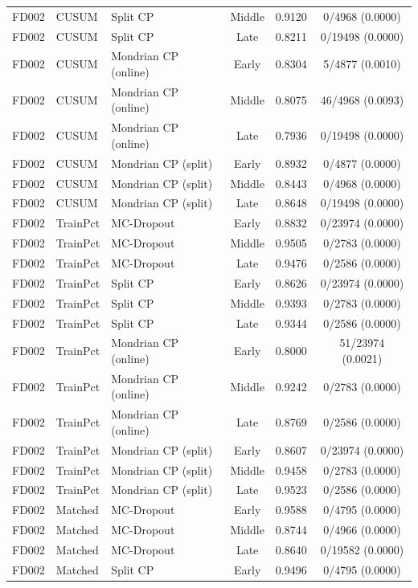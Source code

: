 \begin{table}[t]
\begin{tabular}{lllccc}
FD002 & CUSUM & Split CP & Middle & 0.9120 & 0/4968 (0.0000) \\
FD002 & CUSUM & Split CP & Late & 0.8211 & 0/19498 (0.0000) \\
FD002 & CUSUM & Mondrian CP (online) & Early & 0.8304 & 5/4877 (0.0010) \\
FD002 & CUSUM & Mondrian CP (online) & Middle & 0.8075 & 46/4968 (0.0093) \\
FD002 & CUSUM & Mondrian CP (online) & Late & 0.7936 & 0/19498 (0.0000) \\
FD002 & CUSUM & Mondrian CP (split) & Early & 0.8932 & 0/4877 (0.0000) \\
FD002 & CUSUM & Mondrian CP (split) & Middle & 0.8443 & 0/4968 (0.0000) \\
FD002 & CUSUM & Mondrian CP (split) & Late & 0.8648 & 0/19498 (0.0000) \\
FD002 & TrainPct & MC-Dropout & Early & 0.8832 & 0/23974 (0.0000) \\
FD002 & TrainPct & MC-Dropout & Middle & 0.9505 & 0/2783 (0.0000) \\
FD002 & TrainPct & MC-Dropout & Late & 0.9476 & 0/2586 (0.0000) \\
FD002 & TrainPct & Split CP & Early & 0.8626 & 0/23974 (0.0000) \\
FD002 & TrainPct & Split CP & Middle & 0.9393 & 0/2783 (0.0000) \\
FD002 & TrainPct & Split CP & Late & 0.9344 & 0/2586 (0.0000) \\
FD002 & TrainPct & Mondrian CP (online) & Early & 0.8000 & 51/23974 (0.0021) \\
FD002 & TrainPct & Mondrian CP (online) & Middle & 0.9242 & 0/2783 (0.0000) \\
FD002 & TrainPct & Mondrian CP (online) & Late & 0.8769 & 0/2586 (0.0000) \\
FD002 & TrainPct & Mondrian CP (split) & Early & 0.8607 & 0/23974 (0.0000) \\
FD002 & TrainPct & Mondrian CP (split) & Middle & 0.9458 & 0/2783 (0.0000) \\
FD002 & TrainPct & Mondrian CP (split) & Late & 0.9523 & 0/2586 (0.0000) \\
FD002 & Matched & MC-Dropout & Early & 0.9588 & 0/4795 (0.0000) \\
FD002 & Matched & MC-Dropout & Middle & 0.8744 & 0/4966 (0.0000) \\
FD002 & Matched & MC-Dropout & Late & 0.8640 & 0/19582 (0.0000) \\
FD002 & Matched & Split CP & Early & 0.9496 & 0/4795 (0.0000) \\

\end{tabular}
\end{table}
